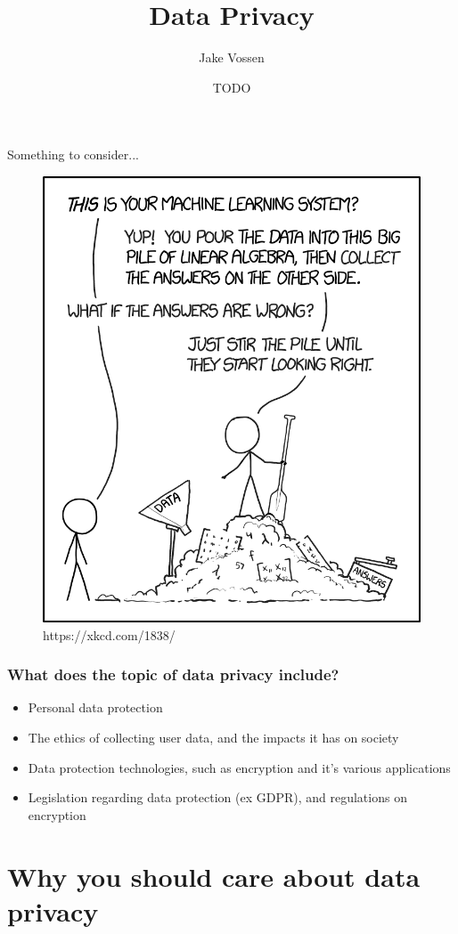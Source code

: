 \documentclass{beamer}
\title{Data Privacy}
\author{Jake Vossen}
\institute{Colorado School of Mines - ACM-W}
\date{TODO}
\begin{document}
\begin{frame}{Something to consider...}
  \begin{figure}
    \includegraphics[scale=.18]{machine_learning_2x.png}
    \caption{https://xkcd.com/1838/}
  \end{figure}
\end{frame}
\begin{frame}
  \titlepage
\end{frame}


\begin{frame}[fragile]
  \frametitle{What does the topic of data privacy include?}
  \begin{itemize}
    \item Personal data protection
    \item The ethics of collecting user data, and the impacts it has on society
    \item Data protection technologies, such as encryption and it's various applications
    \item Legislation regarding data protection (ex GDPR), and regulations on encryption
  \end{itemize}
\end{frame}

\section{Why \textbf{you} should care about data privacy}
\end{document}
